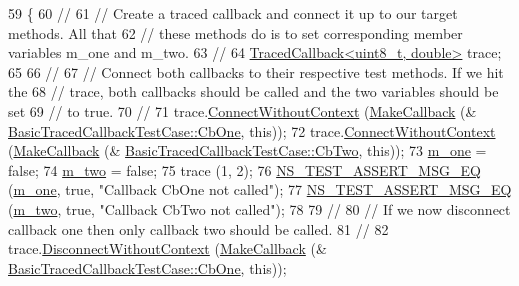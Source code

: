 \begin{DoxyCode}
59 \{
60   \textcolor{comment}{//}
61   \textcolor{comment}{// Create a traced callback and connect it up to our target methods.  All that}
62   \textcolor{comment}{// these methods do is to set corresponding member variables m\_one and m\_two.}
63   \textcolor{comment}{//}
64   \hyperlink{classns3_1_1TracedCallback}{TracedCallback<uint8\_t, double>} trace;
65 
66   \textcolor{comment}{//}
67   \textcolor{comment}{// Connect both callbacks to their respective test methods.  If we hit the }
68   \textcolor{comment}{// trace, both callbacks should be called and the two variables  should be set}
69   \textcolor{comment}{// to true.}
70   \textcolor{comment}{//}
71   trace.\hyperlink{classns3_1_1TracedCallback_aacc251bf4e302e7d034e9f0e25a15980}{ConnectWithoutContext} (\hyperlink{group__makecallbackmemptr_ga9376283685aa99d204048d6a4b7610a4}{MakeCallback} (&
      \hyperlink{classBasicTracedCallbackTestCase_acb573822cead160a028ff63cefbb5e66}{BasicTracedCallbackTestCase::CbOne}, \textcolor{keyword}{this}));
72   trace.\hyperlink{classns3_1_1TracedCallback_aacc251bf4e302e7d034e9f0e25a15980}{ConnectWithoutContext} (\hyperlink{group__makecallbackmemptr_ga9376283685aa99d204048d6a4b7610a4}{MakeCallback} (&
      \hyperlink{classBasicTracedCallbackTestCase_add7162ae75a89256e2528a94d442847d}{BasicTracedCallbackTestCase::CbTwo}, \textcolor{keyword}{this}));
73   \hyperlink{classBasicTracedCallbackTestCase_a64847386a4cf0d07aac0c23639501444}{m\_one} = \textcolor{keyword}{false};
74   \hyperlink{classBasicTracedCallbackTestCase_ae8f2b2a6115490efe626394a676e6da1}{m\_two} = \textcolor{keyword}{false};
75   trace (1, 2);
76   \hyperlink{group__testing_ga2a9d78cffb3db8e867c35fff0b698cf5}{NS\_TEST\_ASSERT\_MSG\_EQ} (\hyperlink{classBasicTracedCallbackTestCase_a64847386a4cf0d07aac0c23639501444}{m\_one}, \textcolor{keyword}{true}, \textcolor{stringliteral}{"Callback CbOne not called"});
77   \hyperlink{group__testing_ga2a9d78cffb3db8e867c35fff0b698cf5}{NS\_TEST\_ASSERT\_MSG\_EQ} (\hyperlink{classBasicTracedCallbackTestCase_ae8f2b2a6115490efe626394a676e6da1}{m\_two}, \textcolor{keyword}{true}, \textcolor{stringliteral}{"Callback CbTwo not called"});
78 
79   \textcolor{comment}{//}
80   \textcolor{comment}{// If we now disconnect callback one then only callback two should be called.}
81   \textcolor{comment}{//}
82   trace.\hyperlink{classns3_1_1TracedCallback_ad16d7d92a245c739670d968ab469c631}{DisconnectWithoutContext} (\hyperlink{group__makecallbackmemptr_ga9376283685aa99d204048d6a4b7610a4}{MakeCallback} (&
      \hyperlink{classBasicTracedCallbackTestCase_acb573822cead160a028ff63cefbb5e66}{BasicTracedCallbackTestCase::CbOne}, \textcolor{keyword}{this}));

\end{DoxyCode}
